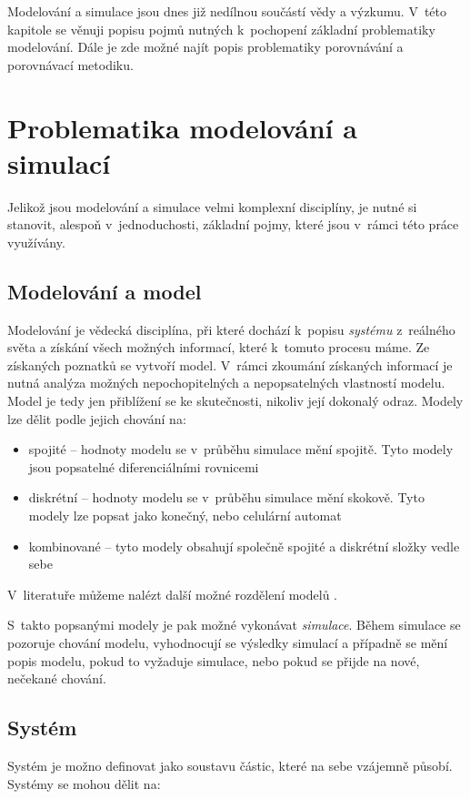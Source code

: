 Modelování a simulace jsou dnes již nedílnou součástí vědy a výzkumu. V~této kapitole se věnuji popisu pojmů nutných k~pochopení základní problematiky modelování. Dále je zde možné najít popis problematiky porovnávání a porovnávací metodiku.

\section{Problematika modelování a simulací}
Jelikož jsou modelování a simulace velmi komplexní disciplíny, je nutné si stanovit, alespoň v~jednoduchosti, základní pojmy, které jsou v~rámci této práce využívány.

\subsection{Modelování a model}
\label{modelovani}
Modelování je vědecká disciplína, při které dochází k~popisu \textit{systému} z~reálného světa a získání všech možných informací, které k~tomuto procesu máme. Ze získaných poznatků se vytvoří model. V~rámci zkoumání získaných informací je nutná analýza možných nepochopitelných a nepopsatelných vlastností modelu. Model je tedy jen přiblížení se ke skutečnosti, nikoliv její dokonalý odraz. Modely lze dělit podle jejich chování na:

\begin{itemize}
    \item spojité -- hodnoty modelu se v~průběhu simulace mění spojitě. Tyto modely jsou popsatelné diferenciálními rovnicemi
    \item diskrétní -- hodnoty modelu se v~průběhu simulace mění skokově. Tyto modely lze popsat jako konečný, nebo celulární automat
    \item kombinované -- tyto modely obsahují společně spojité a diskrétní složky vedle sebe
\end{itemize}

V~literatuře můžeme nalézt další možné rozdělení modelů \cite{IMS-skripta}.


S~takto popsanými modely je pak možné vykonávat \textit{simulace}. Během simulace se pozoruje chování modelu, vyhodnocují se výsledky simulací a případně se mění popis modelu, pokud to vyžaduje simulace, nebo pokud se přijde na nové, nečekané chování.

\subsection{Systém}
Systém je možno definovat jako soustavu částic, které na sebe vzájemně působí. Systémy se mohou dělit na:

